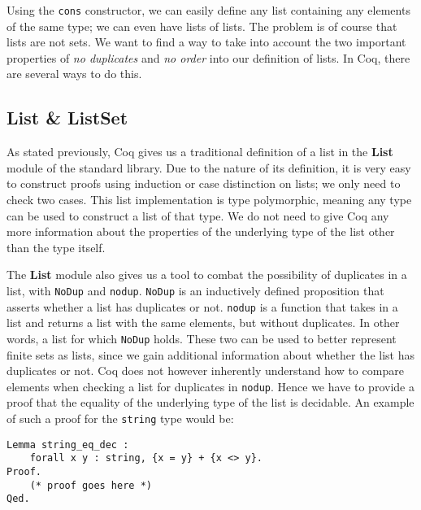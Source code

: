 Using the \lstinline{cons} constructor, we can easily define any list containing any elements of the same type;
we can even have lists of lists.
The problem is of course that lists are not sets. We want to find a way to take into account the two important properties
of \textit{no duplicates} and \textit{no order} into our definition of lists.
In Coq, there are several ways to do this.


\subsection{List \& ListSet}

As stated previously, Coq gives us a traditional definition of a list in the \textbf{List} module of the standard library.
Due to the nature of its definition, it is very easy to construct proofs using induction or case distinction on lists;
we only need to check two cases.
This list implementation is type polymorphic, meaning any type can be used to construct a list of that type.
We do not need to give Coq any more information about the properties of the underlying type of the list other than the type itself.

The \textbf{List} module also gives us a tool to combat the possibility of duplicates in a list,
with \lstinline{NoDup} and \lstinline{nodup}.
\lstinline{NoDup} is an inductively defined proposition that asserts whether a list has duplicates or not.
\lstinline{nodup} is a function that takes in a list and returns a list with the same elements, but without duplicates.
In other words, a list for which \lstinline{NoDup} holds.
These two can be used to better represent finite sets as lists, since
we gain additional information about whether the list has duplicates or not.
Coq does not however inherently understand how to compare elements when checking a list for duplicates in \lstinline{nodup}.
Hence we have to provide a proof that the equality of the underlying type of the list is decidable.
An example of such a proof for the \lstinline{string} type would be:

\begin{minipage}{\linewidth}
\begin{lstlisting}[language=Coq, label={lst:string_eq_dec}, caption={Decidability proof for string equality in Coq}]
Lemma string_eq_dec :
    forall x y : string, {x = y} + {x <> y}.
Proof.
    (* proof goes here *)
Qed.
\end{lstlisting}
\end{minipage}


